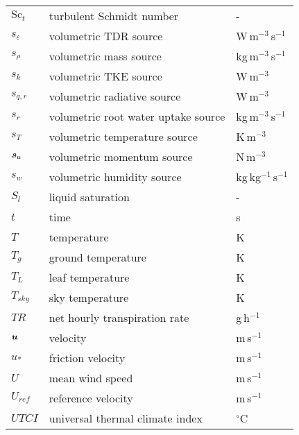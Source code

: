 \begin{longtable}{p{}p{}p{}}
	${\textrm{Sc}_t}$ & turbulent Schmidt number & - \\ 
	$s_{\varepsilon}$ & volumetric TDR source & W\,m$^{-3}$\,s$^{-1}$ \\ 		
	$s_{\rho}$ & volumetric mass source & kg\,m$^{-3}$\,s$^{-1}$ \\ 
	$s_k$ & volumetric TKE source & W\,m$^{-3}$ \\ 		
	$s_{q,r}$ & volumetric radiative source & W\,m$^{-3}$ \\ 		
	$s_r$ & volumetric root water uptake source & kg\,m$^{-3}$\,s$^{-1}$ \\ 	
	$s_T$ & volumetric temperature source & K\,m$^{-3}$ \\ 		
	$\textbf{\textit{s}}_u$ & volumetric momentum source & N\,m$^{-3}$ \\ 	
	$s_w$ & volumetric humidity source & kg\,kg$^{-1}$\,s$^{-1}$ \\ 		
	$S_l$ & liquid saturation & - \\ 			
	$t$ & time & s \\ 
	$T$ & temperature & K  \\ 
	$T_{\textit{g}}$ & ground temperature & K  \\ 	
	$T_{L}$ & leaf temperature & K  \\ 	
	$T_{\textit{sky}}$ & sky temperature & K  \\ 		
	$\textit{TR}$ & net hourly transpiration rate & g\,h$^{-1}$  \\ 	
	$\textbf{\textit{u}}$ & velocity & m\,s$^{-1}$ \\ 
	$u_*$ & friction velocity & m\,s$^{-1}$ \\ 
	$U$ & mean wind speed & m\,s$^{-1}$ \\ 
	$U_{\textit{ref}}$ & reference velocity & m\,s$^{-1}$ \\ 	
	$\textit{UTCI}$ & universal thermal climate index & $^{\circ}$C \\ 	


\end{longtable}
